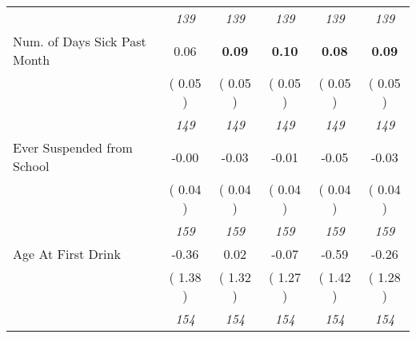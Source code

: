 \begin{tabular}{l c c c c c}
& \textit{ 139 } & \textit{ 139 } & \textit{ 139 } & \textit{ 139 } & \textit{ 139 } \\
Num. of Days Sick Past Month &      0.06 & \textbf{      0.09 } & \textbf{      0.10 } & \textbf{     0.08} & \textbf{     0.09} \\
& (     0.05 ) & (     0.05 ) & (     0.05 ) & (     0.05 ) & (     0.05 ) \\
& \textit{ 149 } & \textit{ 149 } & \textit{ 149 } & \textit{ 149 } & \textit{ 149 } \\
Ever Suspended from School &     -0.00 &     -0.03 &     -0.01 &     -0.05 &     -0.03 \\
& (     0.04 ) & (     0.04 ) & (     0.04 ) & (     0.04 ) & (     0.04 ) \\
& \textit{ 159 } & \textit{ 159 } & \textit{ 159 } & \textit{ 159 } & \textit{ 159 } \\
Age At First Drink &     -0.36 &      0.02 &     -0.07 &     -0.59 &     -0.26 \\
& (     1.38 ) & (     1.32 ) & (     1.27 ) & (     1.42 ) & (     1.28 ) \\
& \textit{ 154 } & \textit{ 154 } & \textit{ 154 } & \textit{ 154 } & \textit{ 154 } \\
\bottomrule
\end{tabular}
